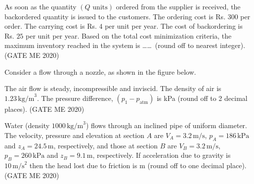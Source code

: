 As soon as the quantity $(Q \text{ units})$ ordered from the supplier is received, the backordered quantity is issued to the customers. The ordering cost is Rs. $300$ per order. The carrying cost is Rs. $4$ per unit per year. The cost of backordering is Rs. $25$ per unit per year. Based on the total cost minimization criteria, the maximum inventory reached in the system is \ldots\ldots \ (round off to nearest integer). \hfill (GATE ME 2020)

\item Consider a flow through a nozzle, as shown in the figure below. 

\begin{center}
%
\end{center}


The air flow is steady, incompressible and inviscid. The density of air is $1.23 \, \text{kg/m}^3$. The pressure difference, $(p_1 - p_{\text{atm}})$ is \underline{\hspace{3cm}} kPa (round off to 2 decimal places). \hfill (GATE ME 2020)

\item
Water (density $1000 \, \text{kg/m}^3$) flows through an inclined pipe of uniform diameter. The velocity, pressure and elevation at section $A$ are $V_A = 3.2 \, \text{m/s}$, $p_A = 186 \, \text{kPa}$ and $z_A = 24.5 \, \text{m}$, respectively, and those at section $B$ are $V_B = 3.2 \, \text{m/s}$, $p_B = 260 \, \text{kPa}$ and $z_B = 9.1 \, \text{m}$, respectively. If acceleration due to gravity is $10 \, \text{m/s}^2$ then the head lost due to friction is \underline{\hspace{3cm}} m (round off to one decimal place). \hfill (GATE ME 2020)

